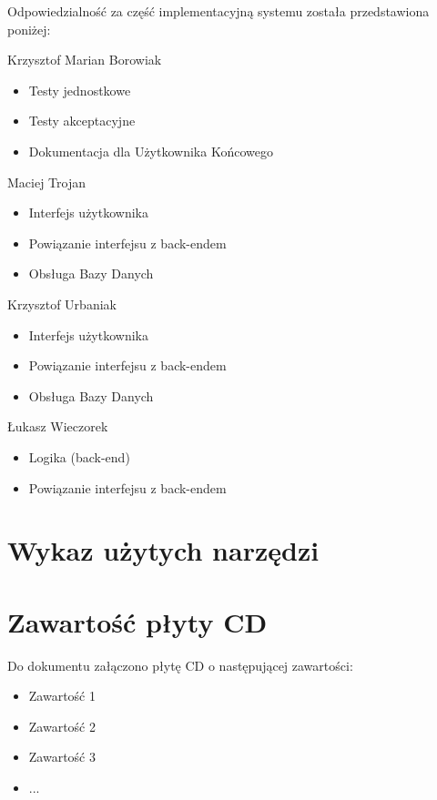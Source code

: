 \noindent

Odpowiedzialność za część implementacyjną systemu została przedstawiona poniżej:

\begin{description}
\item Krzysztof Marian Borowiak

\begin{itemize}
\item Testy jednostkowe
\item Testy akceptacyjne
\item Dokumentacja dla Użytkownika Końcowego
\end{itemize}
\noindent

\item Maciej Trojan

\begin{itemize}
\item Interfejs użytkownika
\item Powiązanie interfejsu z back-endem
\item Obsługa Bazy Danych
\end{itemize}
\noindent

\item Krzysztof Urbaniak

\begin{itemize}
\item Interfejs użytkownika
\item Powiązanie interfejsu z back-endem
\item Obsługa Bazy Danych
\end{itemize}
\noindent

\item Łukasz Wieczorek

\begin{itemize}
\item Logika (back-end)
\item Powiązanie interfejsu z back-endem
\end{itemize}
\noindent

\end{description}


\section{Wykaz użytych narzędzi}
\label{Chapter104}


\section{Zawartość płyty CD}

Do dokumentu załączono płytę CD o następującej zawartości:

\begin{itemize}
\item Zawartość 1
\item Zawartość 2
\item Zawartość 3
\item ...
\end{itemize}